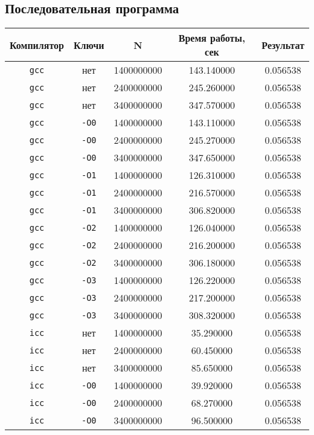 \documentclass[a4paper,12pt]{article}
\begin{document}
\subsection{Последовательная программа}
\begin{tabular}{c | c | c c c}
\textbf{Компилятор} & \textbf{Ключи} & \textbf{N} & \textbf{Время работы, сек} & \textbf{Результат}\\
\hline
\texttt{gcc} & нет & 1400000000 & 143.140000 & 0.056538\\
\texttt{gcc} & нет & 2400000000 & 245.260000 & 0.056538\\
\texttt{gcc} & нет & 3400000000 & 347.570000 & 0.056538\\
\hline
\texttt{gcc} & \texttt{-O0} & 1400000000 & 143.110000 & 0.056538\\
\texttt{gcc} & \texttt{-O0} & 2400000000 & 245.270000 & 0.056538\\
\texttt{gcc} & \texttt{-O0} & 3400000000 & 347.650000 & 0.056538\\
\hline
\texttt{gcc} & \texttt{-O1} & 1400000000 & 126.310000 & 0.056538\\
\texttt{gcc} & \texttt{-O1} & 2400000000 & 216.570000 & 0.056538\\
\texttt{gcc} & \texttt{-O1} & 3400000000 & 306.820000 & 0.056538\\
\hline
\texttt{gcc} & \texttt{-O2} & 1400000000 & 126.040000 & 0.056538\\
\texttt{gcc} & \texttt{-O2} & 2400000000 & 216.200000 & 0.056538\\
\texttt{gcc} & \texttt{-O2} & 3400000000 & 306.180000 & 0.056538\\
\hline
\texttt{gcc} & \texttt{-O3} & 1400000000 & 126.220000 & 0.056538\\
\texttt{gcc} & \texttt{-O3} & 2400000000 & 217.200000 & 0.056538\\
\texttt{gcc} & \texttt{-O3} & 3400000000 & 308.320000 & 0.056538\\
\hline
\hline
\texttt{icc} & нет & 1400000000 & 35.290000 & 0.056538\\
\texttt{icc} & нет & 2400000000 & 60.450000 & 0.056538\\
\texttt{icc} & нет & 3400000000 & 85.650000 & 0.056538\\
\hline
\texttt{icc} & \texttt{-O0} & 1400000000 & 39.920000 & 0.056538\\
\texttt{icc} & \texttt{-O0} & 2400000000 & 68.270000 & 0.056538\\
\texttt{icc} & \texttt{-O0} & 3400000000 & 96.500000 & 0.056538\\

\end{tabular}
\end{document}
